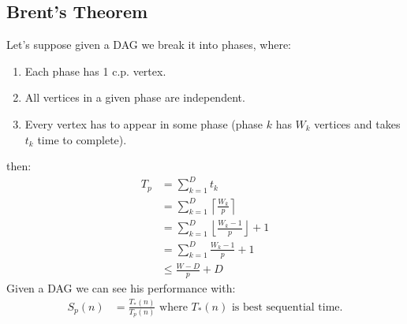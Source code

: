 \documentclass{article}
\newcommand{\ceil}[1]{\left \lceil #1 \right \rceil}
\newcommand{\floor}[1]{\left \lfloor #1 \right \rfloor}
\begin{document}
\subsection*{Brent's Theorem}
Let's suppose given a DAG we break it into phases, where:
\begin{enumerate}
    \item Each phase has 1 c.p. vertex.
    \item All vertices in a given phase are independent.
    \item Every vertex has to appear in some phase (phase $k$ has $W_k$ vertices and takes $t_k$ time to complete).
\end{enumerate}
then:
\begin{align*}
    T_p 
    &= \sum_{k=1}^D t_k \\
    &= \sum_{k=1}^D \ceil{\frac{W_k}{p}} \\
    &= \sum_{k=1}^D \floor{\frac{W_k-1}{p}} + 1 \\
    &= \sum_{k=1}^D \frac{W_k-1}{p}+1 \\
    &\leq \tfrac{W-D}{p}+D
\end{align*}
Given a DAG we can see his performance with:
\begin{align*}
    S_p(n) &= \frac{T_*(n)}{T_p(n)} \text{  where $T_*(n)$ is best sequential time.} 
\end{align*}
\end{document}
